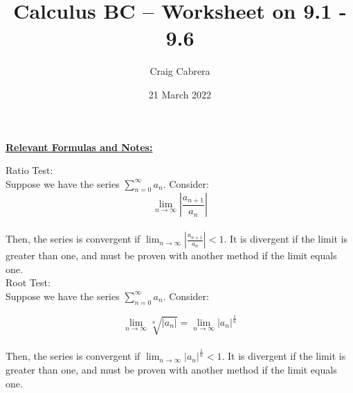 \documentclass[10pt,letterpaper]{report}
\title{Calculus BC -- Worksheet on 9.1 - 9.6 }
\author{Craig Cabrera}
\date{21 March 2022}
\begin{document}
\maketitle
\begin{center}
  \textbf{\underline{Relevant Formulas and Notes:}}
\end{center}

\noindent Ratio Test: \\

\noindent Suppose we have the series $\sum_{n=0}^{\infty}{a_{n}}$. Consider: \\

$$\lim_{n\to\infty}{\left|\frac{a_{n+1}}{a_{n}}\right|}$$ \\

\noindent Then, the series is convergent if $\lim_{n\to\infty}{\left|\frac{a_{n+1}}{a_{n}}\right|} < 1$. It is divergent if the limit is greater than one, and must be proven with another method if the limit equals one. \\

\noindent Root Test: \\

\noindent Suppose we have the series $\sum_{n=0}^{\infty}{a_{n}}$. Consider:

$$\lim_{n\to\infty}{\sqrt[n]{\left|a_{n}\right|}}=\lim_{n\to\infty}{\left|a_{n}\right|^{\frac{1}{n}}}$$ \\

\noindent Then, the series is convergent if $\lim_{n\to\infty}{\left|a_{n}\right|^{\frac{1}{n}}} < 1$. It is divergent if the limit is greater than one, and must be proven with another method if the limit equals one. \\

\pagebreak
\end{document}
